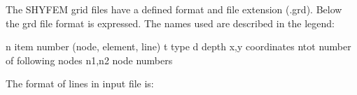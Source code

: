
%
%
%
%
%
%
%
\label{grid}
The SHYFEM grid files have a defined format and file extension (.grd). Below the grd file format is expressed. 
The names used are described in the legend:
\begin{code}
n	item number (node, element, line)
t	type
d	depth
x,y	coordinates
ntot	number of following nodes
n1,n2	node numbers
\end{code}

The format of lines in input file is:


